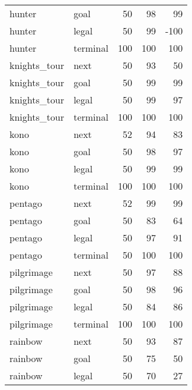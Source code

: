 \documentclass[a4paper,12pt]{report}
\begin{document}
\begin{tabular}{llrrr}
 hunter             & goal        &        50 &      98 &                  99 \\
 hunter             & legal       &        50 &      99 &                -100 \\
 hunter             & terminal    &       100 &     100 &                 100 \\
 knights\_tour       & next        &        50 &      93 &                  50 \\
 knights\_tour       & goal        &        50 &      99 &                  99 \\
 knights\_tour       & legal       &        50 &      99 &                  97 \\
 knights\_tour       & terminal    &       100 &     100 &                 100 \\
 kono               & next        &        52 &      94 &                  83 \\
 kono               & goal        &        50 &      98 &                  97 \\
 kono               & legal       &        50 &      99 &                  99 \\
 kono               & terminal    &       100 &     100 &                 100 \\
 pentago            & next        &        52 &      99 &                  99 \\
 pentago            & goal        &        50 &      83 &                  64 \\
 pentago            & legal       &        50 &      97 &                  91 \\
 pentago            & terminal    &        50 &     100 &                 100 \\
 pilgrimage         & next        &        50 &      97 &                  88 \\
 pilgrimage         & goal        &        50 &      98 &                  96 \\
 pilgrimage         & legal       &        50 &      84 &                  86 \\
 pilgrimage         & terminal    &       100 &     100 &                 100 \\
 rainbow            & next        &        50 &      93 &                  87 \\
 rainbow            & goal        &        50 &      75 &                  50 \\
 rainbow            & legal       &        50 &      70 &                  27 \\

\end{tabular}
\end{document}
